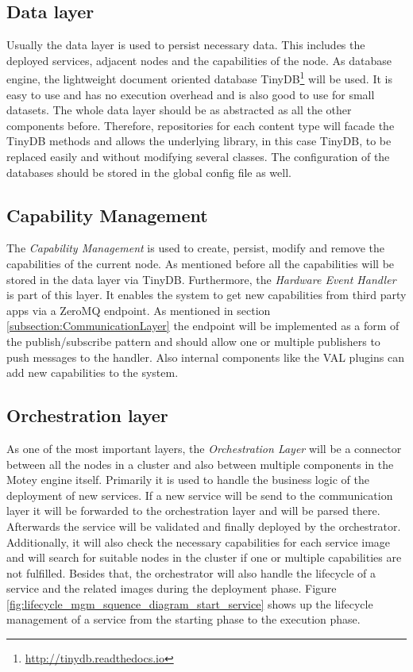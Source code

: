 \subsection{Data layer}
Usually the data layer is used to persist necessary data.
This includes the deployed services, adjacent nodes and the capabilities of the node.
As database engine, the lightweight document oriented database TinyDB\footnote{\url{http://tinydb.readthedocs.io}} will be used.
It is easy to use and has no execution overhead and is also good to use for small datasets.
The whole data layer should be as abstracted as all the other components before.
Therefore, repositories for each content type will facade the TinyDB methods and allows the underlying library, in this case TinyDB, to be replaced easily and
without modifying several classes.
The configuration of the databases should be stored in the global config file as well.


\subsection{Capability Management}
The \textit{Capability Management} is used to create, persist, modify and remove the capabilities of the current node.
As mentioned before all the capabilities will be stored in the data layer via TinyDB.
Furthermore, the \textit{Hardware Event Handler} is part of this layer.
It enables the system to get new capabilities from third party apps via a ZeroMQ endpoint.
As mentioned in section \ref{subsection:CommunicationLayer} the endpoint will be implemented as a form of the publish/subscribe pattern and should allow one or multiple publishers to push messages to the handler.
Also internal components like the \ac{VAL} plugins can add new capabilities to the system.


\subsection{Orchestration layer}
As one of the most important layers, the \textit{Orchestration Layer} will be a connector between all the nodes in a cluster and also between multiple components in the Motey engine itself.
Primarily it is used to handle the business logic of the deployment of new services.
If a new service will be send to the communication layer it will be forwarded to the orchestration layer and will be parsed there.
Afterwards the service will be validated and finally deployed by the orchestrator.
Additionally, it will also check the necessary capabilities for each service image and will search for suitable nodes in the cluster if one or multiple capabilities are not fulfilled.
Besides that, the orchestrator will also handle the lifecycle of a service and the related images during the deployment phase.
Figure \ref{fig:lifecycle_mgm_squence_diagram_start_service} shows up the lifecycle management of a service from the starting phase to the execution phase.

